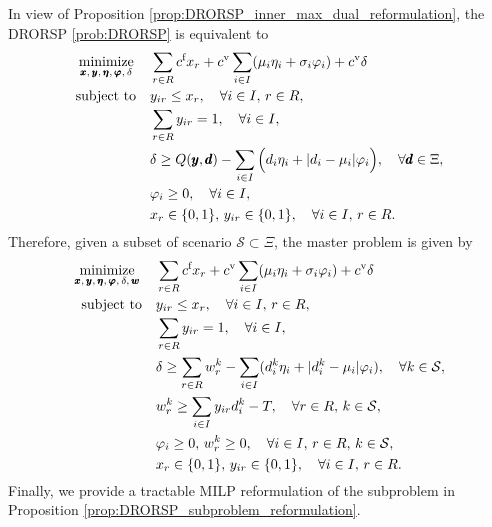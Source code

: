 \documentclass[preprint,review,11pt]{elsarticle}
\theoremstyle{definition}
\theoremstyle{remark}
\newcommand{\calS}{\mathcal{S}}
\newcommand{\xb}{\pmb{x}}
\newcommand{\yb}{\pmb{y}}
\newcommand{\db}{\pmb{d}}
\newcommand{\cf}{c^{\tiny{\textup{f}}}}
\newcommand{\cv}{c^{\tiny{\textup{v}}}}
\newcommand{\wb}{\pmb{w}}
\newcommand{\etab}{\pmb{\eta}}
\newcommand{\vphib}{\pmb{\varphi}}
\begin{document}
In view of Proposition \ref{prop:DRORSP_inner_max_dual_reformulation}, the DRORSP \eqref{prob:DRORSP} is equivalent to
%
\begin{subequations}
\begin{align}
\underset{\xb,\,\yb,\,\etab,\,\vphib,\,\delta}{\text{minimize}}\, \quad
&  \sum_{r\in R} \cf x_r + \cv \sum_{i\in I} (\mu_i\eta_i + \sigma_i\varphi_i) + \cv\delta\\
\text{subject to} \quad
& y_{ir} \leq x_r,\quad\forall i\in I,\, r\in R, \\
& \sum_{r\in R}y_{ir} = 1,\quad\forall i\in I,\\
& \delta \geq Q(\yb,\db) - \sum_{i\in I}\Big( d_i\eta_i + |d_i-\mu_i| \varphi_i \Big),\quad\forall \db\in\Xi, \\
& \varphi_i \geq 0,\quad\forall i\in I, \\
& x_r\in\{0,1\},\,y_{ir}\in\{0,1\},\quad\forall i\in I,\, r\in R.
\end{align}%
\end{subequations}
%
Therefore, given a subset of scenario $\calS\subset\Xi$, the master problem is given by
%
\begin{subequations}
\begin{align}
\underset{\xb,\,\yb,\,\etab,\,\vphib,\,\delta,\,\wb}{\text{minimize}}\, \quad
&  \sum_{r\in R} \cf x_r + \cv \sum_{i\in I} (\mu_i\eta_i + \sigma_i\varphi_i) + \cv\delta\\
\text{subject to} \quad
& y_{ir} \leq x_r,\quad\forall i\in I,\, r\in R, \\
& \sum_{r\in R}y_{ir} = 1,\quad\forall i\in I,\\
& \delta \geq \sum_{r\in R} w_r^k - \sum_{i\in I} ( d^k_i\eta_i + |d^k_i-\mu_i|\varphi_i ), \quad\forall k\in\calS, \\
& w_r^k \geq \sum_{i\in I}y_{ir}d^k_i - T,\quad\forall r\in R,\, k\in\calS, \\
& \varphi_i\geq 0,\, w_r^k \geq 0,\quad\forall i\in I,\, r\in R,\, k\in\calS,\\
& x_r\in\{0,1\},\,y_{ir}\in\{0,1\},\quad\forall i\in I,\, r\in R.
\end{align}%
\end{subequations}
%
Finally, we provide a tractable MILP reformulation of the subproblem in Proposition \ref{prop:DRORSP_subproblem_reformulation}.
\end{document}
